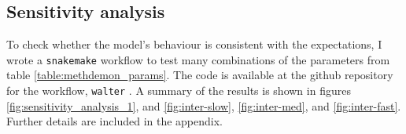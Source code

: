 \subsection{Sensitivity analysis}
To check whether the model's behaviour is consistent with the expectations, I
wrote a \texttt{snakemake} workflow to test many combinations of the parameters
from table \ref{table:methdemon_params}. The code is available at the github
repository for the workflow, \texttt{walter}
\cite{manojlovic_vesmanojlovicwalter_2024}. A summary of the results is shown
in figures \ref{fig:sensitivity_analysis_1}, and \ref{fig:inter-slow},
\ref{fig:inter-med}, and \ref{fig:inter-fast}. Further details are included in
the appendix.

